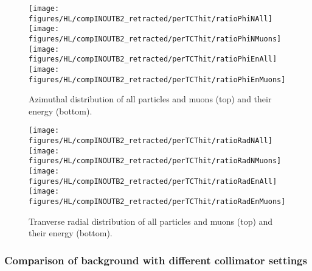 \begin{figure}
\begin{center}
\texttt{[image: figures/HL/compINOUTB2\_retracted/perTCThit/ratioPhiNAll]}
\texttt{[image: figures/HL/compINOUTB2\_retracted/perTCThit/ratioPhiNMuons]}
\texttt{[image: figures/HL/compINOUTB2\_retracted/perTCThit/ratioPhiEnAll]}
\texttt{[image: figures/HL/compINOUTB2\_retracted/perTCThit/ratioPhiEnMuons]}
\end{center}
\vspace{-0.6cm}
 \caption{Azimuthal distribution of all particles and muons (top) and their energy (bottom).
  \label{compPhi}}
\end{figure}

\begin{figure}
\begin{center}
\texttt{[image: figures/HL/compINOUTB2\_retracted/perTCThit/ratioRadNAll]}
\texttt{[image: figures/HL/compINOUTB2\_retracted/perTCThit/ratioRadNMuons]}
\texttt{[image: figures/HL/compINOUTB2\_retracted/perTCThit/ratioRadEnAll]}
\texttt{[image: figures/HL/compINOUTB2\_retracted/perTCThit/ratioRadEnMuons]}
\end{center}
\vspace{-0.6cm}
 \caption{Tranverse radial distribution of all particles and muons (top) and their energy (bottom).
  \label{compRad}}
\end{figure}



\subsubsection{Comparison of background with different collimator settings}


